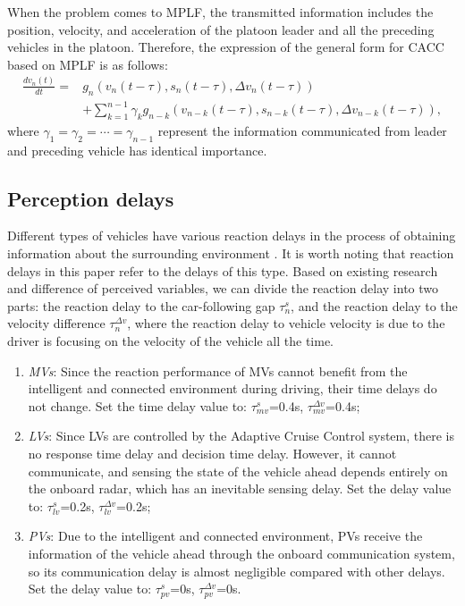 \documentclass[journal]{IEEEtran}
\begin{document}
When the problem comes to MPLF, the transmitted information includes the position, velocity, and acceleration of the platoon leader and all the preceding vehicles in the platoon. Therefore, the expression of the general form for CACC based on MPLF is as follows:
\begin{equation}
  \begin{aligned}
    \frac{d v_{n}(t)}{d t}  = & g_{n} \left(v_{n}(t-\tau), s_{n}(t-\tau), \Delta v_{n}(t-\tau)\right)                                      \\
                              & +\sum_{k=1}^{n-1} \gamma_{k} g_{n-k}\left(v_{n-k}(t-\tau), s_{n-k}(t-\tau), \Delta v_{n-k}(t-\tau)\right),
  \end{aligned}
  \label{Eq4}
\end{equation}
where $\gamma_1=\gamma_2=\cdots	=\gamma_{n-1}$ represent the information communicated from leader and preceding vehicle has identical importance.

\subsection{{Perception delays}}

Different types of vehicles have various reaction delays in the process of obtaining information about the surrounding environment \citep{ngoduy2013analytical,yao2021linear}. It is worth noting that reaction delays in this paper refer to the delays of this type. Based on existing research and difference of perceived variables, we can divide the reaction delay into two parts: the reaction delay to the car-following gap $\tau_n^s$, and the reaction delay to the velocity difference $\tau_n^{\Delta v}$, where the reaction delay to vehicle velocity is due to the driver is focusing on the velocity of the vehicle all the time.

\begin{enumerate}
  \item \emph{MVs}: Since the reaction performance of MVs cannot benefit from the intelligent and connected environment during driving, their time delays do not change. Set the time delay value to:
        $\tau_{mv}^{s}$=0.4s, $\tau_{mv}^{\Delta v}$=0.4s;
  \item \emph{LVs}: Since LVs are controlled by the Adaptive Cruise Control system, there is no response time delay and decision time delay. However, it cannot communicate, and sensing the state of the vehicle ahead depends entirely on the onboard radar, which has an inevitable sensing delay. Set the delay value to: $\tau_{lv}^{s}$=0.2s, $\tau_{lv}^{\Delta v}$=0.2s;
  \item \emph{PVs}: Due to the intelligent and connected environment, PVs receive the information of the vehicle ahead through the onboard communication system, so its communication delay is almost negligible compared with other delays. Set the delay value to: $\tau_{pv}^{s}$=0s, $\tau_{pv}^{\Delta v}$=0s.
\end{enumerate}
\end{document}
